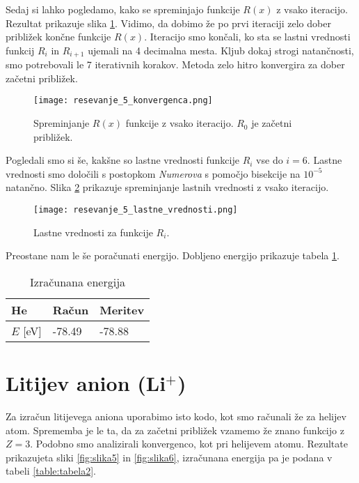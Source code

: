 \documentclass[12pt,a4paper]{article}
\begin{document}
Sedaj si lahko pogledamo, kako se spreminjajo funkcije $R(x)$ z vsako iteracijo. Rezultat prikazuje slika \ref{fig:slika3}. Vidimo, da dobimo že po prvi iteraciji zelo dober približek končne funkcije $R(x)$. Iteracijo smo končali, ko sta se lastni vrednosti funkcij $R_i$ in $R_{i+1}$ ujemali na 4 decimalna mesta. Kljub dokaj strogi natančnosti, smo potrebovali le 7 iterativnih korakov. Metoda zelo hitro konvergira za dober začetni približek.

\begin{figure}[H]
\begin{center}
\texttt{[image: resevanje\_5\_konvergenca.png]}
\caption{Spreminjanje $R(x)$ funkcije z vsako iteracijo. $R_0$ je začetni približek. } \label{fig:slika3}
\end{center}
\end{figure}

Pogledali smo si še, kakšne so lastne vrednosti funkcije $R_i$ vse do $i=6$. Lastne vrednosti smo določili s postopkom \textit{Numerova} s pomočjo bisekcije na $10^{-5}$ natančno. Slika \ref{fig:slika4} prikazuje spreminjanje lastnih vrednosti z vsako iteracijo.
\begin{figure}[H]
\begin{center}
\texttt{[image: resevanje\_5\_lastne\_vrednosti.png]}
\caption{Lastne vrednosti za funkcije $R_i$. } \label{fig:slika4}
\end{center}
\end{figure}
\noindent Preostane nam le še poračunati energijo. Dobljeno energijo prikazuje tabela \ref{table:tabela1}.

\begin{table}[H] 
\begin{center}
\begin{tabular}{|l|l|l|}
\hline
He       & Račun  & Meritev \\ \hline
$E$ [eV] & -78.49 & -78.88  \\ \hline
\end{tabular}
\end{center}
\caption{Izračunana energija}
\label{table:tabela1}
\end{table}

\section*{Litijev anion (Li$^{+}$)}

Za izračun litijevega aniona uporabimo isto kodo, kot smo računali že za helijev atom. Sprememba je le ta, da za začetni približek vzamemo že znano funkcijo z $Z=3$. Podobno smo analizirali konvergenco, kot pri helijevem atomu. Rezultate prikazujeta sliki \ref{fig:slika5} in \ref{fig:slika6}, izračunana energija pa je podana v tabeli \ref{table:tabela2}.
\end{document}
